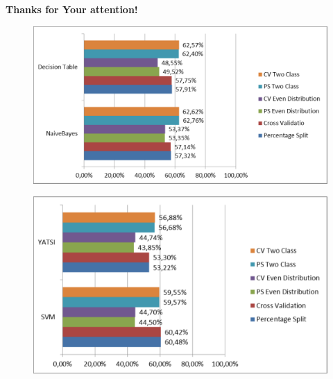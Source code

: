 \documentclass{beamer}
\begin{document}
\begin{frame}
	\frametitle{}
	\centering
	{\Large \textbf{Thanks for Your attention!}}
\end{frame}
\begin{frame}
	\begin{figure}
		\center
		\includegraphics[width=.8\textwidth]{./img/Accuracy1.pdf}
		\end{figure}
\end{frame}
\begin{frame}
	\begin{figure}
		\center
		\includegraphics[width=.8\textwidth]{./img/Accuracy2.pdf}
		\end{figure}
\end{frame}
\end{document}
